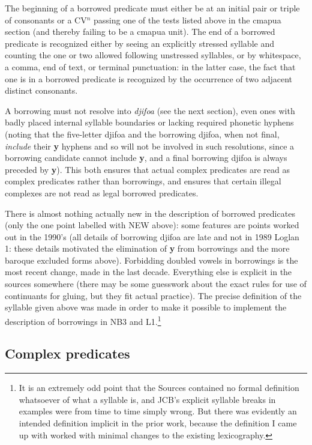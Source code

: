 \documentclass[12pt]{book}
\begin{document}
The beginning of a borrowed predicate must either be at an initial pair or triple of consonants or a CV$^n$ passing one of the tests listed above in the cmapua section (and thereby failing to be a cmapua unit).  The end of a borrowed predicate is recognized either by seeing an explicitly stressed syllable and counting the one or two allowed following unstressed syllables, or by whitespace, a comma, end of text, or terminal punctuation:  in the latter case, the fact that one is in a borrowed predicate is recognized
by the occurrence of two adjacent distinct consonants.

A borrowing must not resolve into {\em djifoa} (see the next section), even ones with badly placed internal syllable boundaries or lacking required phonetic hyphens (noting that the five-letter djifoa and the borrowing djifoa, when not final, {\em include} their {\bf y} hyphens and so will not be involved in such resolutions, since a borrowing candidate cannot include {\bf y}, and a final borrowing djifoa is always preceded by {\bf y}).  This both ensures that actual complex predicates are read as complex predicates rather than borrowings, and ensures that certain illegal complexes are not read as legal borrowed predicates.

There is almost nothing actually new in the description of borrowed predicates (only the one point labelled with NEW above):  some features are points worked out in the 1990's (all details of borrowing djifoa are late and not in 1989 Loglan 1:  these details motivated the elimination of {\bf y} from borrowings and the more baroque excluded forms above).  Forbidding doubled vowels in borrowings is the most recent change, made in the last decade.
Everything else is explicit in the sources somewhere (there may be some guesswork about the exact rules for use of continuants for gluing, but they fit actual practice).  The precise definition of the syllable given above  was made in order to make it possible to implement the description of borrowings in NB3 and L1.\footnote{It is an extremely odd point that the Sources contained no formal definition whatsoever of what a syllable is, and JCB's explicit syllable breaks in examples were from time to time simply wrong.  But there was evidently an intended definition implicit in the prior work, because the definition I came up with worked with minimal changes to the existing lexicography.}

\subsection{Complex predicates}
\end{document}
